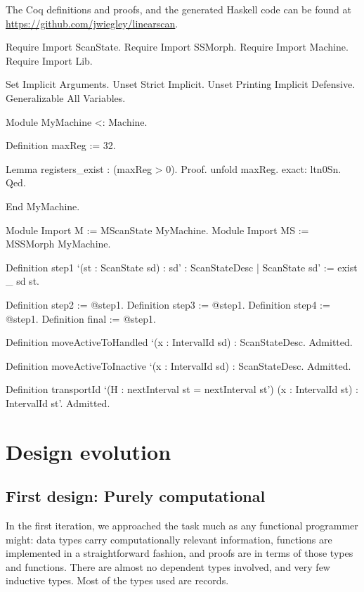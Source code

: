 \documentclass{llncs}
\begin{document}
The Coq definitions and proofs, and the generated Haskell code can be found at
\url{https://github.com/jwiegley/linearscan}.


\begin{coq_eval}
Require Import ScanState.
Require Import SSMorph.
Require Import Machine.
Require Import Lib.

Set Implicit Arguments.
Unset Strict Implicit.
Unset Printing Implicit Defensive.
Generalizable All Variables.

Module MyMachine <: Machine.

Definition maxReg := 32.

Lemma registers_exist : (maxReg > 0).
Proof. unfold maxReg. exact: ltn0Sn. Qed.

End MyMachine.

Module Import M := MScanState MyMachine.
Module Import MS := MSSMorph MyMachine.

Definition step1 `(st : ScanState sd)
  : { sd' : ScanStateDesc | ScanState sd' } :=
  exist _ sd st.

Definition step2 := @step1.
Definition step3 := @step1.
Definition step4 := @step1.
Definition final := @step1.

Definition moveActiveToHandled `(x : IntervalId sd) : ScanStateDesc.
Admitted.

Definition moveActiveToInactive `(x : IntervalId sd) : ScanStateDesc.
Admitted.

Definition transportId `(H : nextInterval st = nextInterval st')
  (x : IntervalId st) : IntervalId st'.
Admitted.
\end{coq_eval}

\section{Design evolution}
\label{sec:evolve}

\subsection{First design: Purely computational}
\label{sec:compdesign}

In the first iteration, we approached the task much as any functional
programmer might: data types carry computationally relevant information,
functions are implemented in a straightforward fashion, and proofs are in
terms of those types and functions.  There are almost no dependent types
involved, and very few inductive types.  Most of the types used are records.
\end{document}
